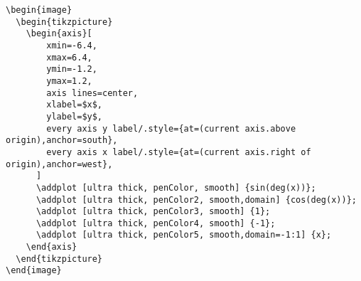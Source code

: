 \documentclass{ximera}
\begin{document}
\begin{verbatim}
\begin{image}
  \begin{tikzpicture}
    \begin{axis}[
        xmin=-6.4,
        xmax=6.4,
        ymin=-1.2,
        ymax=1.2,
        axis lines=center,
        xlabel=$x$,
        ylabel=$y$,
        every axis y label/.style={at=(current axis.above origin),anchor=south},
        every axis x label/.style={at=(current axis.right of origin),anchor=west},
      ]
      \addplot [ultra thick, penColor, smooth] {sin(deg(x))};
      \addplot [ultra thick, penColor2, smooth,domain] {cos(deg(x))};
      \addplot [ultra thick, penColor3, smooth] {1};
      \addplot [ultra thick, penColor4, smooth] {-1};
      \addplot [ultra thick, penColor5, smooth,domain=-1:1] {x};
    \end{axis}
  \end{tikzpicture}
\end{image}
\end{verbatim}
\end{document}
